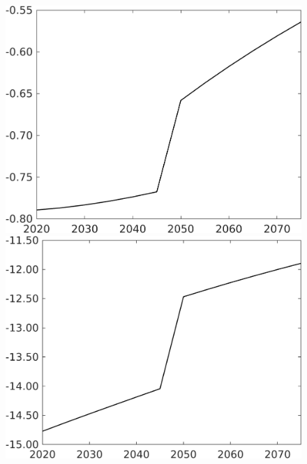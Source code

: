 \documentclass[12pt]{article}
\begin{document}
\begin{figure}[h!!]
\begin{minipage}[]{0.32\textwidth}
	\end{minipage}	
	\begin{minipage}[]{0.32\textwidth}
		\includegraphics[width=1\textwidth]{../../codding_model/own_basedOnFried/optimalPol_010922_revision/figures/all_13Sept22/CompTaufPER_bytaul_Reg0_Lf_spillover0_nsk0_xgr0_knspil1_sep0_LFlimit1_emsbase0_countec0_GovRev0_etaa0.79_lgd0.png}
	\end{minipage}		
	\begin{minipage}[]{0.32\textwidth}
		\includegraphics[width=1\textwidth]{../../codding_model/own_basedOnFried/optimalPol_010922_revision/figures/all_13Sept22/CompTaufPER_bytaul_Reg0_Lg_spillover0_nsk0_xgr0_knspil1_sep0_LFlimit1_emsbase0_countec0_GovRev0_etaa0.79_lgd0.png}

\end{minipage}
\end{figure}
\end{document}
